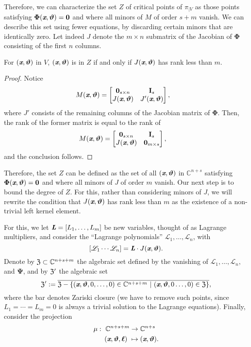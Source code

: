 \documentclass[sigconf]{acmart}
\def\thetab{\bm{\vartheta}}
\def\xb{\textit{\textbf{x}}}
\def\C{\mathbb{C}}
\def\dt{s}
\def\bbm{\begin{bmatrix}}
\def\ebm{\end{bmatrix}}
\begin{document}
Therefore, we can characterize the set $Z$ of critical points of
$\pi_{|V}$ as those points satisfying $\bm\Phi(\xb,\thetab)=\bm 0$ and
where all minors of $M$ of order $\dt+m$ vanish. We can describe this
set using fewer equations, by discarding certain minors that are
identically zero. Let indeed $J$ denote the $m \times n$ submatrix of
the Jacobian of $\bm\Phi$ consisting of the first $n$ columns.
\begin{lemma} 
  For $(\xb,\thetab)$ in $V$, $(\xb,\thetab)$ is in $Z$ if and only if
  $J(\xb,\thetab)$ has rank less than $m$.
\end{lemma}
\begin{proof}
Notice 
%
\begin{align*}
M(\xb,\thetab)&= 
\bbm 
\textbf{0}_{\dt \times n} &\textbf{I}_{\dt} \\
J(\xb,\thetab)     &J'(\xb,\thetab)
\ebm,
\end{align*}
where $J'$ consists of the remaining columns of the Jacobian matrix of
$\bm\Phi$.  Then, the rank of the former matrix is equal to the rank
of
\begin{align*}
M(\xb,\thetab)&= 
\bbm 
\textbf{0}_{\dt \times n} &\textbf{I}_{\dt} \\
J(\xb,\thetab)     & \bm 0_{m \times s}
\ebm,
\end{align*}
and the conclusion follows.
\end{proof}
Therefore, the set $Z$ can be defined as the set of all
$(\xb,\thetab)$ in $\C^{n+\dt}$ satisfying $\bm\Phi(\xb,\thetab)=\bm
0$ and where all minors of $J$ of order $m$ vanish. Our next step is
to bound the degree of $Z$. For this, rather than considering minors
of $J$, we will rewrite the condition that $J(\xb,\thetab)$ has rank
less than $m$ as the existence of a non-trivial left kernel element.

For this, we let $\textit{\textbf{L}}=[L_1,\hdots,L_m]$ be new
variables, thought of as Lagrange multipliers, and consider the
``Lagrange polynomials'' $\mathscr{L}_1,\dots,\mathscr{L}_{n}$, with
\[
[\mathscr{L}_1 \cdots \mathscr{L}_{n}]=\textit{\textbf{L}}\cdot J(\xb,\thetab).
\] 
Denote by $\frak{Z} \subset \C^{n+\dt+m}$ the algebraic set defined by
the vanishing of $\mathscr{L}_1,\hdots,\mathscr{L}_{n},$ and
$\bm\Psi$, and by $\frak{Z}'$ the algebraic set
\[
\frak{Z}' := \overline{\frak{Z} - \{(\textit{\textbf{x}},\thetab,0,\hdots,0) \in \C^{n+\dt+m}~|~(\textit{\textbf{x}},\thetab,0\hdots,0) \in \frak{Z}\}},
\]
where the bar denotes Zariski closure (we have to remove such points,
since $L_1=\cdots=L_m=0$ is always a trivial solution to the Lagrange
equations). Finally, consider the projection
\begin{align*} 
\mu :~ \C^{n+\dt+m} &\rightarrow \C^{n+\dt}\\
(\textit{\textbf{x}},\thetab,\bm \ell)~ &\mapsto (\textit{\textbf{x}},\thetab).
\end{align*}
\end{document}
